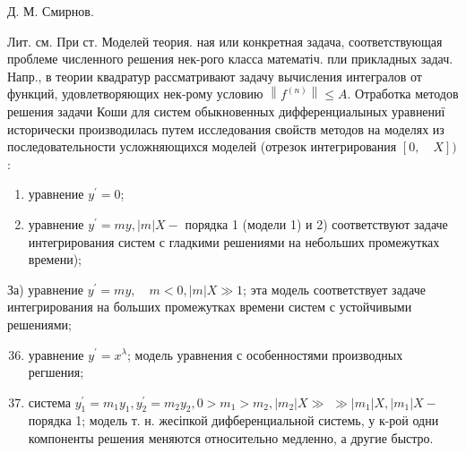 \documentclass[10pt]{article}
\begin{document}
Д. М. Смирнов.



Лит. см. При ст. Моделей теория. ная или конкретная задача, соответствующая проблеме численного решения нек-рого класса математіч. пли прикладных задач. Напр., в теории квадратур рассматривают задачу вычисления интегралов от функций, удовлетворяющих нек-рому условию $\left\|f^{(n)}\right\| \leqslant A$. Отработка методов решения задачи Коши для систем обыкновенных дифференциалыных уравнениї исторически производилась путем исследования свойств методов на моделях из последовательности усложняющихся моделей (отрезок интегрирования $[0, \quad X])$ :



\begin{enumerate}

  \item уравнение $y^{\prime}=0$;



  \item уравнение $y^{\prime}=m y,|m| X-$ порядка 1 (модели 1) и 2) соответствуют задаче интегрирования систем с гладкими решениями на небольших промежутках времени);



\end{enumerate}



За) уравнение $y^{\prime}=m y, \quad m<0,|m| X \gg 1$; эта модель соответствует задаче интегрирования на больших промежутках времени систем с устойчивыми решениями;



\begin{enumerate}

  \setcounter{enumi}{35}

  \item уравнение $y^{\prime}=x^{\lambda}$; модель уравнения с особенностями производных регшения;



  \item система $y_{1}^{\prime}=m_{1} y_{1}, y_{2}^{\prime}=m_{2} y_{2}, 0>m_{1}>m_{2},\left|m_{2}\right| X \gg$ $\gg\left|m_{1}\right| X,\left|m_{1}\right| X-$ порядка 1; модель т. н. жесіпкой дифберенциальной системь, у к-роӥ одни компоненты решения меняются относительно медленно, а другие быстро.



\end{enumerate}
\end{document}
